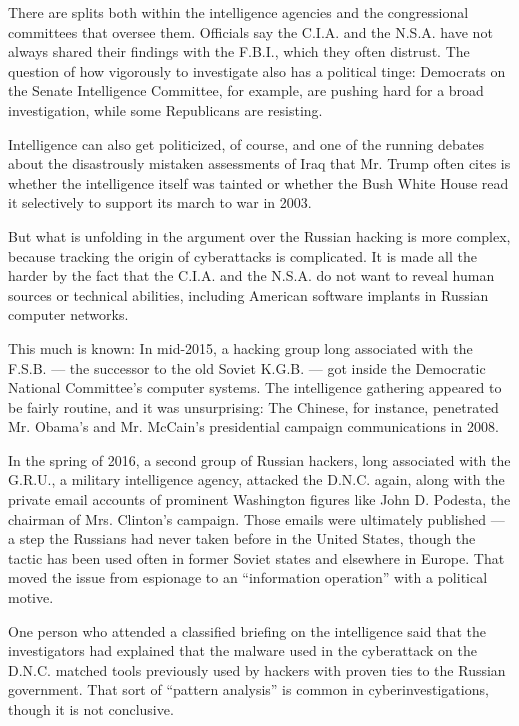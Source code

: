 There are splits both within the intelligence agencies and the
congressional committees that oversee them. Officials say the C.I.A. and
the N.S.A. have not always shared their findings with the F.B.I., which
they often distrust. The question of how vigorously to investigate also
has a political tinge: Democrats on the Senate Intelligence Committee,
for example, are pushing hard for a broad investigation, while some
Republicans are resisting.

Intelligence can also get politicized, of course, and one of the running
debates about the disastrously mistaken assessments of Iraq that Mr.
Trump often cites is whether the intelligence itself was tainted or
whether the Bush White House read it selectively to support its march to
war in 2003.

But what is unfolding in the argument over the Russian hacking is more
complex, because tracking the origin of cyberattacks is complicated. It
is made all the harder by the fact that the C.I.A. and the N.S.A. do not
want to reveal human sources or technical abilities, including American
software implants in Russian computer networks.

This much is known: In mid-2015, a hacking group long associated with
the F.S.B. --- the successor to the old Soviet K.G.B. --- got inside the
Democratic National Committee's computer systems. The intelligence
gathering appeared to be fairly routine, and it was unsurprising: The
Chinese, for instance, penetrated Mr. Obama's and Mr. McCain's
presidential campaign communications in 2008.

In the spring of 2016, a second group of Russian hackers, long
associated with the G.R.U., a military intelligence agency, attacked the
D.N.C. again, along with the private email accounts of prominent
Washington figures like John D. Podesta, the chairman of Mrs. Clinton's
campaign. Those emails were ultimately published --- a step the Russians
had never taken before in the United States, though the tactic has been
used often in former Soviet states and elsewhere in Europe. That moved
the issue from espionage to an ``information operation'' with a
political motive.

One person who attended a classified briefing on the intelligence said
that the investigators had explained that the malware used in the
cyberattack on the D.N.C. matched tools previously used by hackers with
proven ties to the Russian government. That sort of ``pattern analysis''
is common in cyberinvestigations, though it is not conclusive.

